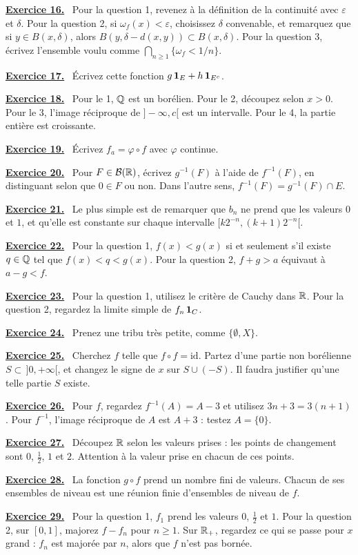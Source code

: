 \documentclass[11pt]{article}
\newcounter{exo}
\newcommand{\indic}[1]{%
  \par\addvspace{0.5em}%
  \hypertarget{ind-#1}{}%
  {\sffamily\bfseries\hyperlink{exo-#1}{Exercice #1.}}\ %
}
\begin{document}
\indic{16} Pour la question 1, revenez à la définition de la continuité avec $\varepsilon$ et $\delta$. Pour la question 2, si $\omega_f(x) < \varepsilon$, choisissez $\delta$ convenable, et remarquez que si $y \in B(x,\delta)$, alors $B(y,\delta - d(x,y)) \subset B(x,\delta)$. Pour la question 3, écrivez l'ensemble voulu comme $\bigcap_{n\geq 1}\{\omega_f < 1/n\}$.

\indic{17} Écrivez cette fonction $g\,\mathbf{1}_E + h\,\mathbf{1}_{{E}^{c}}$.

\indic{18} Pour le 1, $\mathbb{Q}$ est un borélien. Pour le 2, découpez selon $x>0$. Pour le 3, l'image réciproque de $]-\infty,c[$ est un intervalle. Pour le 4, la partie entière est croissante.

\indic{19} Écrivez $f_a = \varphi \circ f$ avec $\varphi$ continue.

\indic{20} Pour $F \in \mathcal{B}(\mathbb{R})$, écrivez $g^{-1}(F)$ à l'aide de $f^{-1}(F)$, en distinguant selon que $0 \in F$ ou non. Dans l'autre sens, $f^{-1}(F) = g^{-1}(F) \cap E$.

\indic{21} Le plus simple est de remarquer que $b_n$ ne prend que les valeurs $0$ et $1$, et qu'elle est constante sur chaque intervalle $[k2^{-n},(k+1)2^{-n}[$.

\indic{22} Pour la question 1, $f(x) < g(x)$ si et seulement s'il existe $q\in\mathbb{Q}$ tel que $f(x) < q < g(x)$. Pour la question 2, $f+g>a$ équivaut à $a-g<f$.

\indic{23} Pour la question 1, utilisez le critère de Cauchy dans $\mathbb{R}$. Pour la question 2, regardez la limite simple de $f_n\,\mathbf{1}_C$.

\indic{24} Prenez une tribu très petite, comme $\{\emptyset,X\}$.

\indic{25} Cherchez $f$ telle que $f \circ f = \mathrm{id}$. Partez d'une partie non borélienne $S \subset\, ]0,+\infty[$, et changez le signe de $x$ sur $S\cup(-S)$. Il faudra justifier qu'une telle partie $S$ existe.

\indic{26} Pour $f$, regardez $f^{-1}(A) = A - 3$ et utilisez $3n+3 = 3(n+1)$. Pour $f^{-1}$, l'image réciproque de $A$ est $A+3$ : testez $A = \{0\}$.

\indic{27} Découpez $\mathbb{R}$ selon les valeurs prises : les points de changement sont $0$, $\frac12$, $1$ et $2$. Attention à la valeur prise en chacun de ces points.

\indic{28} La fonction $g \circ f$ prend un nombre fini de valeurs. Chacun de ses ensembles de niveau est une réunion finie d'ensembles de niveau de $f$.

\indic{29} Pour la question 1, $f_1$ prend les valeurs $0$, $\frac12$ et $1$. Pour la question 2, sur $[0,1]$, majorez $f-f_n$ pour $n\geq 1$. Sur $\mathbb{R}_+$, regardez ce qui se passe pour $x$ grand : $f_n$ est majorée par $n$, alors que $f$ n'est pas bornée.
\end{document}
